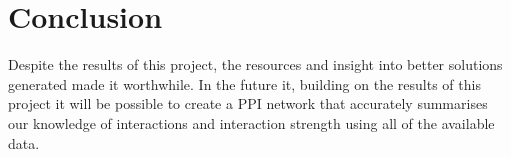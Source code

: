 




\section*{Conclusion}

Despite the results of this project, the resources and insight into better solutions generated made it worthwhile.
In the future it, building on the results of this project it will be possible to create a PPI network that accurately summarises our knowledge of interactions and interaction strength using all of the available data.
